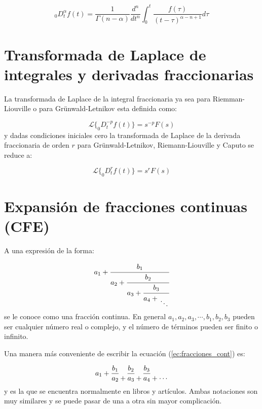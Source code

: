 	\begin{equation}
		_{0}D_{t}^{\alpha}f(t) = \frac{1}{\Gamma(n-\alpha)} \frac{d^{n}}{dt^{n}} \int_{0}^{t} \frac{f(\tau)}{(t - \tau)^{\alpha - n + 1}} d\tau
	\end{equation}
		
	\section{Transformada de Laplace de integrales y derivadas fraccionarias}
	
	La transformada de Laplace de la integral fraccionaria ya sea para Riemman-Liouville o para Grünwald-Letnikov esta definida como:
	
	\begin{equation}
	 	\mathcal{L} \{ _{0}D_{t}^{-p} f(t) \} = s^{-p} F(s)
	\end{equation} 
	y dadas condiciones iniciales cero  la transformada de Laplace de la derivada fraccionaria de orden $r$ para Grünwald-Letnikov, Riemann-Liouville y Caputo se reduce a:
	
	\begin{equation}
		\mathcal{L} \{ _{0}D_{t}^{r} f(t) \} = s^{r} F(s)
	\end{equation}
	
	
	\section{Expansión de fracciones continuas (CFE)}\label{sec:CFE}
	
	A una expresión de la forma:

	\begin{equation}
		a_{1} + \cfrac{b_{1}}{a_{2} + \cfrac{b_{2}}{a_{3} + \cfrac{b_{3}}{a_{4} + \genfrac{}{}{0pt}{0}{}{\ddots}}}}
		\label{ec:fracciones_cont}
	\end{equation} 
	se le conoce como una fracción continua. En general $a_{1},a_{2},a_{3}, \cdots, b_{1}, b_{2}, b_{3}$ pueden ser cualquier número real o complejo, y el número de términos pueden ser finito o infinito.

	Una manera más conveniente de escribir la ecuación (\ref{ec:fracciones_cont}) es:

	\begin{equation}
		a_{1} + \frac{b_{1}}{a_{2} } \genfrac{}{}{0pt}{0}{}{+}   \frac{b_{2}}{a_{3}}  \genfrac{}{}{0pt}{0}{}{+}  \frac{b_{3}}{a_{4}}  \genfrac{}{}{0pt}{0}{}{+}  \genfrac{}{}{0pt}{0}{}{\cdots} 
		\label{ec:fracciones_cont_sim}
	\end{equation}
	y es la que se encuentra normalmente en libros y artículos. Ambas notaciones son  muy similares y se puede pasar de una a otra sin mayor complicación.

